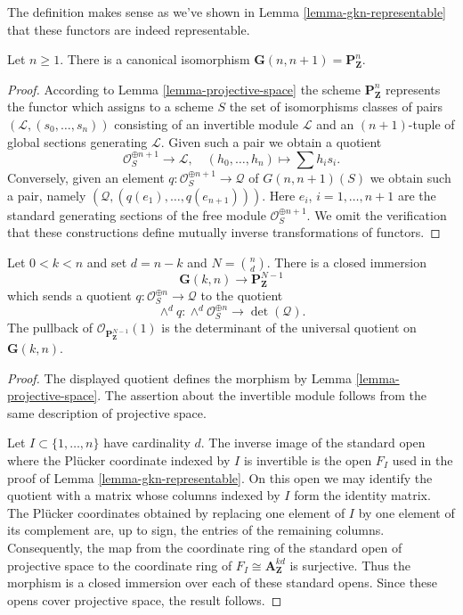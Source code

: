 \noindent
The definition makes sense as we've shown in
Lemma \ref{lemma-gkn-representable}
that these functors are indeed representable.

\begin{lemma}
\label{lemma-projective-space-grassmannian}
Let $n \geq 1$. There is a canonical isomorphism
$\mathbf{G}(n, n + 1) = \mathbf{P}^n_\mathbf{Z}$.
\end{lemma}

\begin{proof}
According to Lemma \ref{lemma-projective-space} the scheme
$\mathbf{P}^n_\mathbf{Z}$ represents the functor
which assigns to a scheme $S$ the set of isomorphisms classes
of pairs $(\mathcal{L}, (s_0, \ldots, s_n))$ consisting of
an invertible module $\mathcal{L}$ and an $(n + 1)$-tuple
of global sections generating $\mathcal{L}$.
Given such a pair we obtain a quotient
$$
\mathcal{O}_S^{\oplus n + 1} \longrightarrow \mathcal{L},\quad
(h_0, \ldots, h_n) \longmapsto \sum h_i s_i.
$$
Conversely, given an element
$q : \mathcal{O}_S^{\oplus n + 1} \to \mathcal{Q}$ of $G(n, n + 1)(S)$
we obtain such a pair, namely $(\mathcal{Q}, (q(e_1), \ldots, q(e_{n + 1})))$.
Here $e_i$, $i = 1, \ldots, n + 1$ are the standard generating sections
of the free module $\mathcal{O}_S^{\oplus n + 1}$.
We omit the verification that these constructions define mutually
inverse transformations of functors.
\end{proof}

\begin{lemma}
\label{lemma-grassmannian-pluecker}
Let $0 < k < n$ and set $d = n - k$ and $N = \binom{n}{d}$.
There is a closed immersion
$$
\mathbf{G}(k, n) \longrightarrow \mathbf{P}^{N - 1}_{\mathbf{Z}}
$$
which sends a quotient
$q : \mathcal{O}_S^{\oplus n} \to \mathcal{Q}$ to the quotient
$$
\wedge^d q : \wedge^d\mathcal{O}_S^{\oplus n}
\longrightarrow \det(\mathcal{Q}).
$$
The pullback of $\mathcal{O}_{\mathbf{P}^{N - 1}_{\mathbf{Z}}}(1)$
is the determinant of the universal quotient on $\mathbf{G}(k, n)$.
\end{lemma}

\begin{proof}
The displayed quotient defines the morphism by
Lemma \ref{lemma-projective-space}. The assertion about the invertible
module follows from the same description of projective space.

Let $I \subset \{1, \ldots, n\}$ have cardinality $d$. The inverse
image of the standard open where the Pl\"ucker coordinate indexed by
$I$ is invertible is the open $F_I$ used in the proof of
Lemma \ref{lemma-gkn-representable}. On this open we may identify the
quotient with a matrix whose columns indexed by $I$ form the identity
matrix. The Pl\"ucker coordinates obtained by replacing one element of
$I$ by one element of its complement are, up to sign, the entries of
the remaining columns. Consequently, the map from the coordinate ring
of the standard open of projective space to the coordinate ring of
$F_I \cong \mathbf{A}^{kd}_{\mathbf{Z}}$ is surjective. Thus the
morphism is a closed immersion over each of these standard opens.
Since these opens cover projective space, the result follows.
\end{proof}








